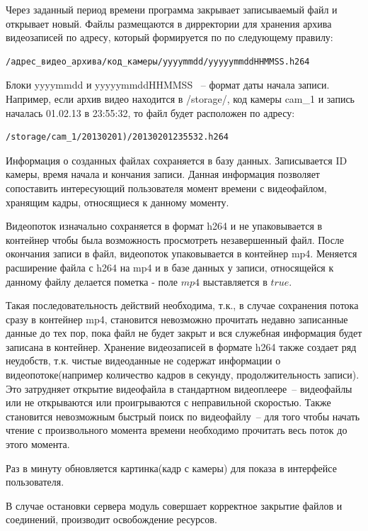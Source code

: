 Через заданный период времени программа закрывает записываемый файл и открывает новый.
Файлы размещаются в дирректории для хранения архива видеозаписей по адресу,
который формируется по по следующему правилу:

\begin{verbatim}
/адрес_видео_архива/код_камеры/yyyymmdd/yyyyymmddHHMMSS.h264
\end{verbatim}

Блоки yyyymmdd и yyyyymmddHHMMSS ~-- формат даты начала записи.
Например, если архив видео находится в /storage/, код камеры cam\_1 и запись началась
01.02.13 в 23:55:32, то файл будет расположен по адресу:

\begin{verbatim}
/storage/cam_1/20130201)/20130201235532.h264
\end{verbatim}

Информация о созданных файлах сохраняется в базу данных.
Записывается ID камеры, время начала и кончания записи.
Данная информация позволяет сопоставить интересующий пользователя момент времени
с видеофайлом, хранящим кадры, относящиеся к данному моменту.

Видеопоток изначально сохраняется в формат h264 и не упаковывается в контейнер чтобы была
возможность просмотреть незавершенный файл. После окончания записи в файл, видеопоток
упаковывается в контейнер mp4. Меняется расширение файла с h264 на mp4 и в базе данных
у записи, относящейся к данному файлу делается пометка - поле $mp4$ выставляется
в $true$.

Такая последовательность действий необходима, т.к., в случае сохранения потока сразу в
контейнер mp4, становится невозможно прочитать недавно записанные данные до тех пор,
пока файл не будет закрыт и вся служебная информация будет записана в контейнер.
Хранение видеозаписей в формате h264 также создает ряд неудобств, т.к. чистые видеоданные не
содержат информации о видеопотоке(например количество кадров в секунду,
продолжительность записи). Это затрудняет открытие видеофайла в стандартном видеоплеере~--
видеофайлы или не открываются или проигрываются с неправильной скоростью.
Также становится невозможным быстрый поиск по видеофайлу~-- для того чтобы начать чтение
с произвольного момента времени необходимо прочитать весь поток до этого момента.

Раз в минуту обновляется картинка(кадр с камеры) для показа в интерфейсе пользователя.

В случае остановки сервера модуль совершает корректное закрытие файлов и соединений,
производит освобождение ресурсов.

